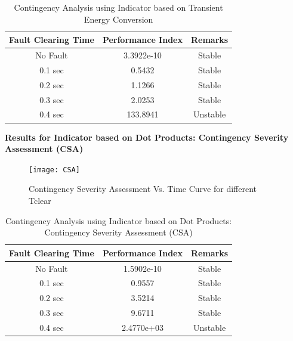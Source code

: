 \documentclass [xcolor=svgnames, t] {beamer}
\begin{document}
\begin{frame}%
\begin{figure}
\addtocounter{subfigure}{4}
    \centering
\subfloat[Tclear = 0.4 sec]{
    \texttt{[image: TE A4]}}
\end{figure}
\begin{table}[H]
\renewcommand{\arraystretch}{1}
\caption{Contingency Analysis using Indicator based on Transient Energy Conversion}
\begin{center}
\begin{tabular}{|c|c|c|}
\hline
 \textbf{Fault Clearing Time} & \textbf{Performance Index} & \textbf{Remarks}  \\ \hline
No Fault & 3.3922e-10  & Stable \\ \hline
 0.1 sec & 0.5432  & Stable \\ \hline
 0.2 sec & 1.1266  & Stable \\ \hline
 0.3 sec & 2.0253  & Stable \\ \hline
 0.4 sec & 133.8941  & Unstable \\ \hline
\end{tabular}
\end{center}
\end{table}
\end{frame}

\begin{frame}{\textbf{Results for Indicator based on Dot Products: Contingency Severity Assessment (CSA)}}

\begin{figure}
    \centering
    \texttt{[image: CSA]}
\caption{Contingency Severity Assessment Vs. Time Curve for different Tclear}
\end{figure}
\end{frame}

\begin{frame}%
\begin{table}[H]
\renewcommand{\arraystretch}{1}
\caption{Contingency Analysis using Indicator based on Dot Products: Contingency Severity Assessment (CSA)}
\begin{center}
\begin{tabular}{|c|c|c|}
\hline
 \textbf{Fault Clearing Time} & \textbf{Performance Index} & \textbf{Remarks}  \\ \hline
 No Fault & 1.5902e-10  & Stable \\ \hline
 0.1 sec & 0.9557  & Stable \\ \hline
 0.2 sec & 3.5214  & Stable \\ \hline
 0.3 sec & 9.6711  & Stable \\ \hline
 0.4 sec & 2.4770e+03  & Unstable \\ \hline
\end{tabular}
\end{center}
\end{table}
\end{frame}
\end{document}
